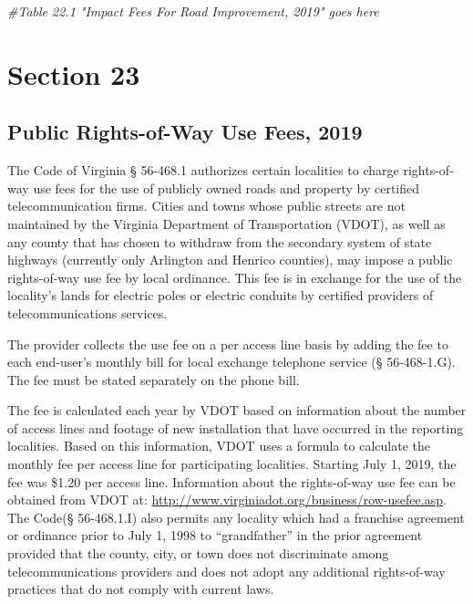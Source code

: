 \documentclass[
]{book}
\newenvironment{Shaded}{\begin{snugshade}}{\end{snugshade}}
\newcommand{\CommentTok}[1]{\textcolor[rgb]{0.56,0.35,0.01}{\textit{#1}}}
\begin{document}
\begin{Shaded}
\begin{Highlighting}[]
\CommentTok{\#Table 22.1 "Impact Fees For Road Improvement, 2019" goes here}
\end{Highlighting}
\end{Shaded}

\hypertarget{section-23}{%
\chapter{Section 23}\label{section-23}}

\hypertarget{public-rights-of-way-use-fees-2019}{%
\section{Public Rights-of-Way Use Fees, 2019}\label{public-rights-of-way-use-fees-2019}}

The Code of Virginia § 56-468.1 authorizes certain localities to charge rights-of-way use fees for the use of publicly owned roads and property by certified telecommunication firms. Cities and towns whose public streets are not maintained by the Virginia Department of Transportation (VDOT), as well as any county that has chosen to withdraw from the secondary system of state highways (currently only Arlington and Henrico counties), may impose a public rights-of-way use fee by local ordinance. This fee is in exchange for the use of the locality's lands for electric poles or electric conduits by certified providers of telecommunications services.

The provider collects the use fee on a per access line basis by adding the fee to each end-user's monthly bill for local exchange telephone service (§ 56-468-1.G). The fee must be stated separately on the phone bill.

The fee is calculated each year by VDOT based on information about the number of access lines and footage of new installation that have occurred in the reporting localities. Based on this information, VDOT uses a formula to calculate the monthly fee per access line for participating localities. Starting July 1, 2019, the fee was \$1.20 per access line. Information about the rights-of-way use fee can be obtained from VDOT at: \url{http://www.virginiadot.org/business/row-usefee.asp}. The Code(§ 56-468.1.I) also permits any locality which had a franchise agreement or ordinance prior to July 1, 1998 to ``grandfather'' in the prior agreement provided that the county, city, or town does not discriminate among telecommunications providers and does not adopt any additional rights-of-way practices that do not comply with current laws.
\end{document}
